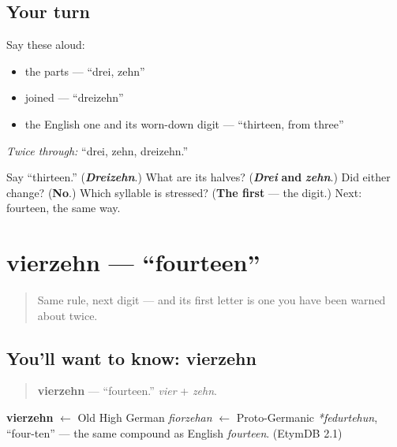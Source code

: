 \subsection*{Your turn}
Say these aloud:

\begin{itemize}
\raggedright
  \item the parts — \textquotedblleft{}drei, zehn\textquotedblright{}
  \item joined — \textquotedblleft{}dreizehn\textquotedblright{}
  \item the English one and its worn-down digit — \textquotedblleft{}thirteen, from three\textquotedblright{}
\end{itemize}

\emph{Twice through:} \textquotedblleft{}drei, zehn, dreizehn.\textquotedblright{}

\begin{tcolorbox}[breakable,colback=teal!4,colframe=teal!35!black,title={Before you move on}]
Say \textquotedblleft{}thirteen.\textquotedblright{} (\emph{\textbf{Dreizehn}}.) What are its halves? (\emph{\textbf{Drei}} \textbf{and} \emph{\textbf{zehn}}.) Did either change? (\textbf{No}.) Which syllable is stressed? (\textbf{The first} — the digit.) Next: fourteen, the same way.
\end{tcolorbox}
\section[vierzehn]{vierzehn — \textquotedblleft{}fourteen\textquotedblright{}}

\label{lesson:GE-C12-vierzehn}



\begin{quote}
Same rule, next digit — and its first letter is one you have been warned about twice.
\end{quote}

\subsection*{You'll want to know: vierzehn}
\begin{quote}
\textbf{vierzehn} — \textquotedblleft{}fourteen.\textquotedblright{} \emph{vier} + \emph{zehn}.
\end{quote}

\begin{cousinweb}
\textbf{vierzehn} $\leftarrow$ Old High German \emph{fiorzehan} $\leftarrow$ Proto-Germanic \emph{*fedurtehun}, \textquotedblleft{}four-ten\textquotedblright{} — the same compound as English \emph{fourteen}. (EtymDB 2.1)
\end{cousinweb}

